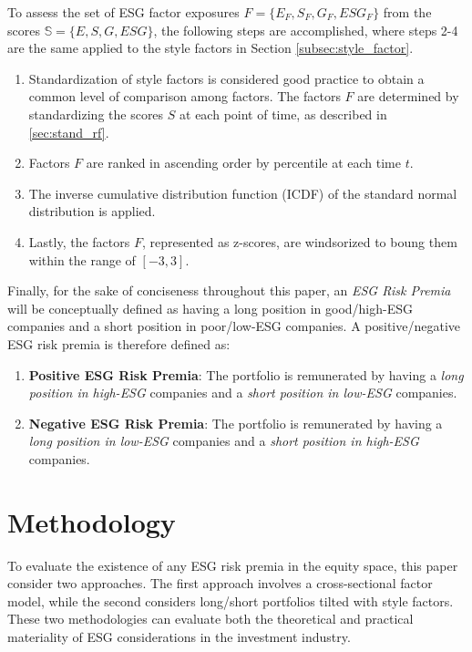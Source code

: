 \documentclass[11pt,a4paper]{article}
\begin{document}
To assess the set of ESG factor exposures $F = \{E_F, S_F, G_F, ESG_F\}$ from the scores $\mathbb{S} = \{E, S, G, ESG\}$, the following steps are accomplished, where steps 2-4 are the same applied to the style factors in Section \ref{subsec:style_factor}.

\begin{enumerate}
    \item Standardization of style factors is considered good practice to obtain a common level of comparison among factors.
    The factors $F$ are determined by standardizing the scores $S$ at each point of time, as described in \ref{sec:stand_rf}.
    \item Factors $F$ are ranked in ascending order by percentile at each time $t$.
    \item The inverse cumulative distribution function (ICDF) of the standard normal distribution is applied.
    \item Lastly, the factors $F$, represented as z-scores, are windsorized to boung them within the range of $[-3,3]$.
\end{enumerate}

Finally, for the sake of conciseness throughout this paper, an \textit{ESG Risk Premia} will be conceptually defined as having a long position in good/high-ESG companies and a short position in poor/low-ESG companies. A positive/negative ESG risk premia is therefore defined as:
\begin{enumerate}
    \item \textbf{Positive ESG Risk Premia}: The portfolio is remunerated by having a \textit{long position in high-ESG} companies and a \textit{short position in low-ESG} companies.
    \item \textbf{Negative ESG Risk Premia}: The portfolio is remunerated by having a \textit{long position in low-ESG} companies and a \textit{short position in high-ESG} companies.
\end{enumerate}

\clearpage

\section{Methodology}\label{sec:methodology}

To evaluate the existence of any ESG risk premia in the equity space, this paper consider two approaches. The first approach involves a cross-sectional factor model, while the second considers long/short portfolios tilted with style factors.
These two methodologies can evaluate both the theoretical and practical materiality of ESG considerations in the investment industry. 
\end{document}

